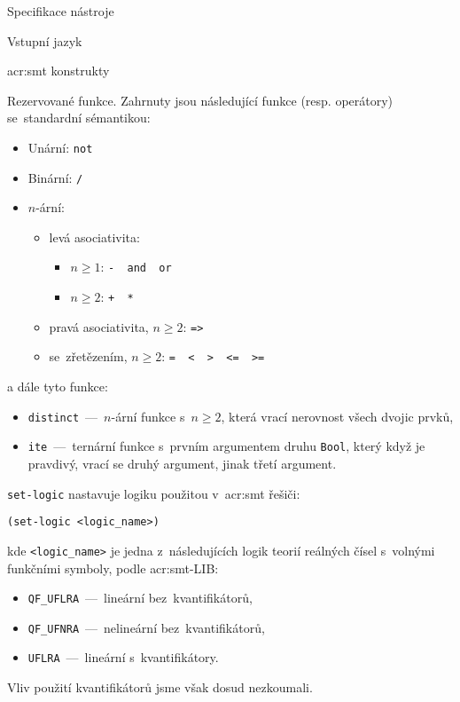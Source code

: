 \documentclass[thesis=M,czech]{FITthesis}[2012/06/26]
\newcommand{\acrlabel}[1]{acr:#1}
\newcommand{\acr}[1]{\acrshort{\acrlabel{#1}}}
\newcommand{\id}[1]{\texttt{#1}}
\begin{document}
\begin{section}{Specifikace nástroje}
\begin{subsection}{Vstupní jazyk}
\begin{subsubsection}{\acr{smt} konstrukty}

\begin{paragraph}{Rezervované funkce.}\label{p:design:spec:ilang:smt:reserved}
Zahrnuty jsou následující funkce (resp. operátory)
se~standardní sémantikou:
\begin{itemize}
\item Unární:  \quad \id{not}
\item Binární: \quad \id{/}
\item $n$-ární:
   \begin{itemize}
   \item levá asociativita:
      \begin{itemize}
      \item ${n \geq 1}$: \quad \id{- \ and \  or}
      \item ${n \geq 2}$: \quad \id{+ \  *}
      \end{itemize}
   \item pravá asociativita, ${n \geq 2}$: \quad \id{=>}
   \item se~zřetězením, ${n \geq 2}$:  \quad \id{= \  < \  > \  <= \  >=}
   \end{itemize}
\end{itemize}
a dále tyto funkce:
\begin{itemize}
\item \id{distinct}~---~$n$-ární funkce s~${n \geq 2}$,
   která vrací nerovnost všech dvojic prvků,
\item \id{ite}~---~ternární funkce s~prvním argumentem druhu \id{Bool},
   který když je pravdivý,
   vrací se druhý argument, jinak třetí argument.
\end{itemize}
\end{paragraph} %


\begin{paragraph}{\id{set-logic}}\label{p:design:spec:ilang:smt:logic}
nastavuje logiku použitou v~\acr{smt} řešiči:
\begin{center}
\id{(set-logic <logic\_\-name>)}
\end{center}
kde \id{<logic\_\-name>} je jedna z~následujících logik
teorií reálných čísel s~volnými funkčními symboly,
podle \acr{smt}-LIB:
\begin{itemize}
\item \id{QF\_\-UFLRA}~---~lineární bez~kvantifikátorů,
\item \id{QF\_\-UFNRA}~---~nelineární bez~kvantifikátorů,
\item \id{UFLRA}~---~lineární s~kvantifikátory.
\end{itemize}
Vliv použití kvantifikátorů jsme však dosud nezkoumali.


\end{paragraph}
\end{subsubsection}
\end{subsection}
\end{section}
\end{document}

